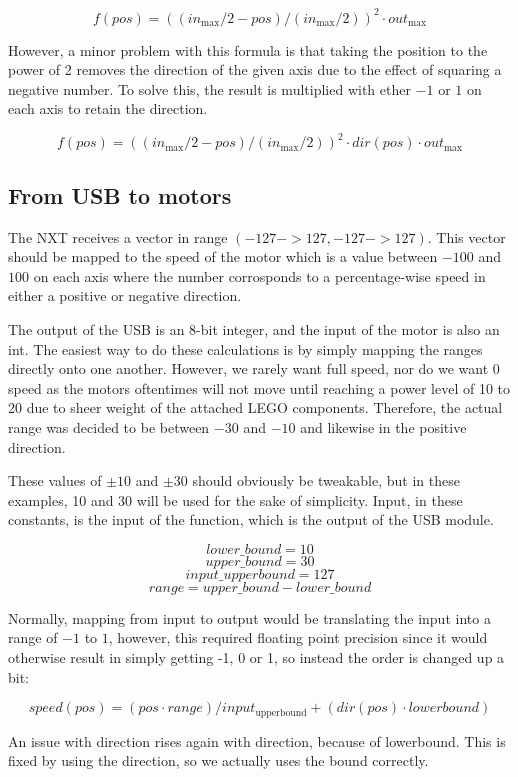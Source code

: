 $$
f(pos) = ((in_\text{max}/2 - pos)/(in_\text{max}/2))^2 \cdot out_\text{max}
$$

However, a minor problem with this formula is that taking the position to the power of 2 removes the direction of the given axis due to the effect of squaring a negative number.
To solve this, the result is multiplied with ether $-1$ or $1$ on each axis to retain the direction.

$$
f(pos) = ((in_\text{max}/2 - pos)/(in_\text{max}/2))^2 \cdot dir(pos) \cdot out_\text{max}
$$

\subsection{From USB to motors}
The NXT receives a vector in range $(-127 -> 127, -127 -> 127)$.
This vector should be mapped to the speed of the motor which is a value between $-100$ and $100$ on each axis where the number corrosponds to a percentage-wise speed in either a positive or negative direction.

The output of the USB is an 8-bit integer, and the input of the motor is also an int.
The easiest way to do these calculations is by simply mapping the ranges directly onto one another.
However, we rarely want full speed, nor do we want 0 speed as the motors oftentimes will not move until reaching a power level of 10 to 20 due to sheer weight of the attached LEGO components.
Therefore, the actual range was decided to be between $-30$ and $-10$ and likewise in the positive direction.

These values of $\pm10$ and $\pm30$ should obviously be tweakable, but in these examples, 10 and 30 will be used for the sake of simplicity. 
Input, in these constants, is the input of the function, which is the output of the USB module.

	$$lower\_bound = 10$$
	$$upper\_bound = 30$$
	$$input\_upperbound = 127$$
	$$range = upper\_bound - lower\_bound$$

Normally, mapping from input to output would be translating the input into a range of $-1$ to $1$, however, this required floating point precision since it would otherwise result in simply getting -1, 0 or 1, so instead the order is changed up a bit:

$$
speed(pos) = (pos \cdot range)/input_\text{upperbound} + (dir(pos) \cdot lowerbound)
$$

An issue with direction rises again with direction, because of lowerbound.
This is fixed by using the direction, so we actually uses the bound correctly. 